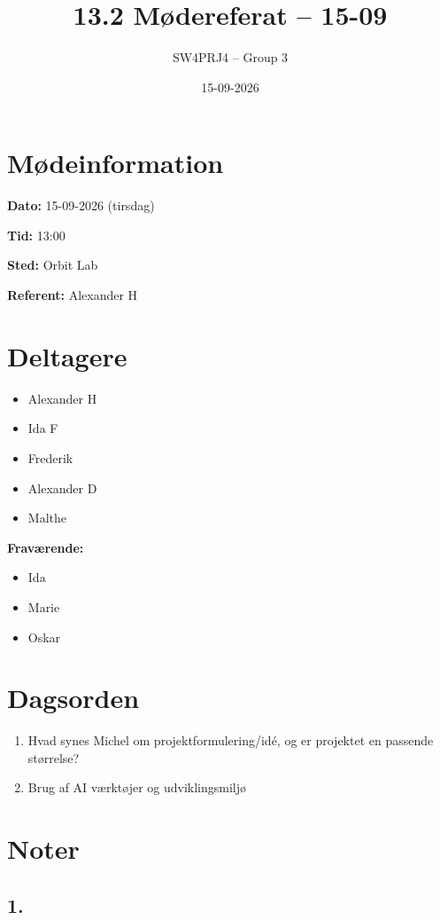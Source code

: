 \documentclass[a4paper,11pt]{article}
\title{13.2 Mødereferat -- 15-09}
\author{SW4PRJ4 -- Group 3}
\date{15-09-2026}
\begin{document}
\maketitle

\section*{Mødeinformation}

\textbf{Dato:} 15-09-2026 (tirsdag)

\textbf{Tid:} 13:00

\textbf{Sted:} Orbit Lab

\textbf{Referent:} Alexander H

\section*{Deltagere}

\begin{itemize}
    \item Alexander H
    \item Ida F
    \item Frederik
    \item Alexander D
    \item Malthe
\end{itemize}

\textbf{Fraværende:}

\begin{itemize}
    \item Ida
    \item Marie
    \item Oskar
\end{itemize}

\section*{Dagsorden}

\begin{enumerate}
    \item Hvad synes Michel om projektformulering/idé, og er projektet en passende størrelse?
    \item Brug af AI værktøjer og udviklingsmiljø
\end{enumerate}

\section*{Noter}
\subsection*{1.}
\end{document}
